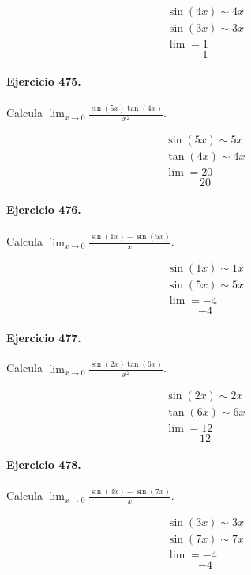 \documentclass[11pt,a4paper]{article}
\begin{document}
\[
\begin{aligned}
\sin(4x)\sim 4x\\
\sin(3x)\sim 3x\\
\lim=1
\end{aligned}
\]
\[\boxed{1}\]


\paragraph{Ejercicio 475.} Calcula $\displaystyle\lim_{x\to0}\frac{\sin(5x)\tan(4x)}{x^2}$.

\[
\begin{aligned}
\sin(5x)\sim 5x\\
\tan(4x)\sim 4x\\
\lim=20
\end{aligned}
\]
\[\boxed{20}\]


\paragraph{Ejercicio 476.} Calcula $\displaystyle\lim_{x\to0}\frac{\sin(1x)-\sin(5x)}{x}$.

\[
\begin{aligned}
\sin(1x)\sim 1x\\
\sin(5x)\sim 5x\\
\lim=-4
\end{aligned}
\]
\[\boxed{-4}\]


\paragraph{Ejercicio 477.} Calcula $\displaystyle\lim_{x\to0}\frac{\sin(2x)\tan(6x)}{x^2}$.

\[
\begin{aligned}
\sin(2x)\sim 2x\\
\tan(6x)\sim 6x\\
\lim=12
\end{aligned}
\]
\[\boxed{12}\]


\paragraph{Ejercicio 478.} Calcula $\displaystyle\lim_{x\to0}\frac{\sin(3x)-\sin(7x)}{x}$.

\[
\begin{aligned}
\sin(3x)\sim 3x\\
\sin(7x)\sim 7x\\
\lim=-4
\end{aligned}
\]
\[\boxed{-4}\]
\end{document}
